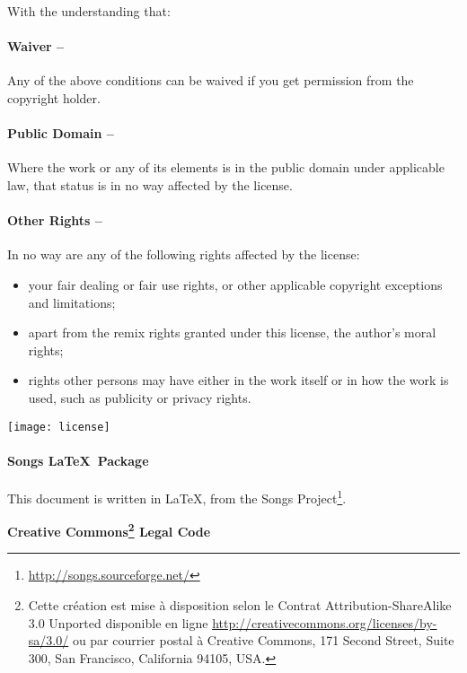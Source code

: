 {\begin{lblock}{With the understanding that:}
    \hspace{0.4cm}
    \parbox{15cm}{
      \paragraph{Waiver --}
      Any of the above conditions can be waived if you get permission
      from the copyright holder.

      \paragraph{Public Domain --}
      Where the work or any of its elements is in the public domain
      under applicable law, that status is in no way affected by the
      license.

      \paragraph{Other Rights --}
      In no way are any of the following rights affected by the license:
      \begin{itemize}
      \item your fair dealing or fair use rights, or other applicable
        copyright exceptions and limitations;
      \item apart from the remix rights granted under this license,
        the author's moral rights;
      \item rights other persons may have either in the work itself
        or in how the work is used, such as publicity or privacy rights.
      \end{itemize}
    }

    \begin{center}
      \texttt{[image: license]}
    \end{center}

  \end{lblock}
  \paragraph{Songs \LaTeX~Package}
  This document is written in \LaTeX, from the Songs
  Project\footnote{\url{http://songs.sourceforge.net/}}.
}{
  \begin{center}
    \textbf{\LARGE{Creative Commons\footnote{ Cette création est mise à
          disposition selon le Contrat Attribution-ShareAlike 3.0
          Unported disponible en ligne
          \url{http://creativecommons.org/licenses/by-sa/3.0/} ou par
          courrier postal à Creative Commons, 171 Second Street, Suite
          300, San Francisco, California 94105, USA.} Legal Code} }
  \end{center}
  \vspace{1cm}

}
